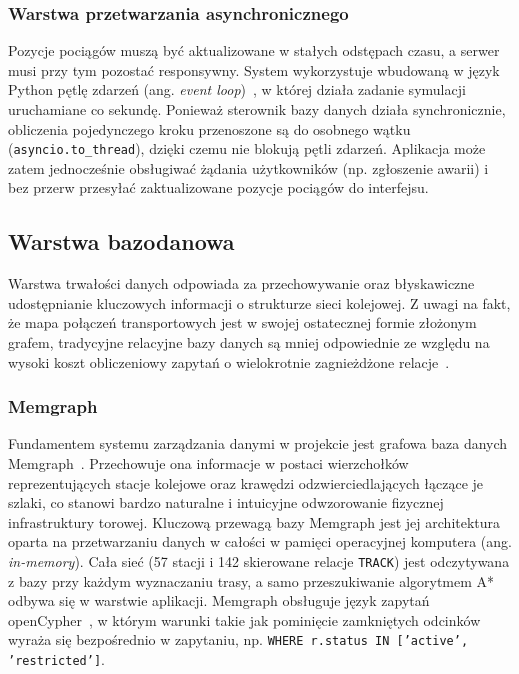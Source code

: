 \documentclass[twoside]{projektInzynierskiMS1z}
\begin{document}
\subsubsection{Warstwa przetwarzania asynchronicznego}

Pozycje pociągów muszą być aktualizowane w stałych odstępach czasu, a serwer
musi przy tym pozostać responsywny. System wykorzystuje wbudowaną w język Python
pętlę zdarzeń (ang. \emph{event loop})~\cite{pythonasyncio}, w której działa
zadanie symulacji uruchamiane co sekundę. Ponieważ sterownik bazy danych działa
synchronicznie, obliczenia pojedynczego kroku przenoszone są do osobnego wątku
(\texttt{asyncio.to\_thread}), dzięki czemu nie blokują pętli zdarzeń.
Aplikacja może zatem jednocześnie obsługiwać żądania użytkowników (np.
zgłoszenie awarii) i bez przerw przesyłać zaktualizowane pozycje pociągów do
interfejsu.

\subsection{Warstwa bazodanowa}

Warstwa trwałości danych odpowiada za przechowywanie oraz błyskawiczne udostępnianie
kluczowych informacji o strukturze sieci kolejowej. Z uwagi na fakt, że mapa połączeń
transportowych jest w swojej ostatecznej formie złożonym grafem, tradycyjne relacyjne
bazy danych są mniej odpowiednie ze względu na wysoki koszt obliczeniowy zapytań
o wielokrotnie zagnieżdżone relacje~\cite{graphdatabases}.

\subsubsection{Memgraph}

Fundamentem systemu zarządzania danymi w projekcie jest grafowa baza danych
Memgraph~\cite{memgraph}. Przechowuje ona informacje w postaci wierzchołków
reprezentujących stacje kolejowe oraz krawędzi odzwierciedlających łączące je szlaki,
co stanowi bardzo naturalne i intuicyjne odwzorowanie fizycznej infrastruktury torowej.
Kluczową przewagą bazy Memgraph jest jej architektura oparta na przetwarzaniu danych
w całości w pamięci operacyjnej komputera (ang. \emph{in-memory}). Cała sieć (57 stacji i 142 skierowane relacje \texttt{TRACK}) jest odczytywana
z bazy przy każdym wyznaczaniu trasy, a samo przeszukiwanie algorytmem A*
odbywa się w warstwie aplikacji. Memgraph obsługuje język zapytań
openCypher~\cite{cypher}, w którym warunki takie jak pominięcie zamkniętych
odcinków wyraża się bezpośrednio w zapytaniu, np.
\texttt{WHERE r.status IN ['active', 'restricted']}.
\end{document}
